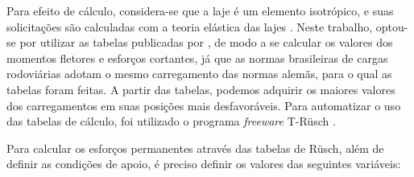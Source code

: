 \begin{table}[htb]
\end{table}
Para efeito de cálculo, considera-se que a laje é um elemento isotrópico, e suas solicitações são calculadas com a teoria elástica das lajes . Neste trabalho, optou-se por utilizar as tabelas publicadas por , de modo a se calcular os valores dos momentos fletores e esforços cortantes, já que as normas brasileiras de cargas rodoviárias adotam o mesmo carregamento das normas alemãs, para o qual as tabelas foram feitas. A partir das tabelas, podemos adquirir os maiores valores dos carregamentos em suas posições mais desfavoráveis. Para automatizar o uso das tabelas de cálculo, foi utilizado o programa \textit{freeware} T-Rüsch  \cite{Serapiao_e_Khouri}.

Para calcular os esforços permanentes através das tabelas de Rüsch, além de definir as condições de apoio, é preciso definir os valores das seguintes variáveis:

